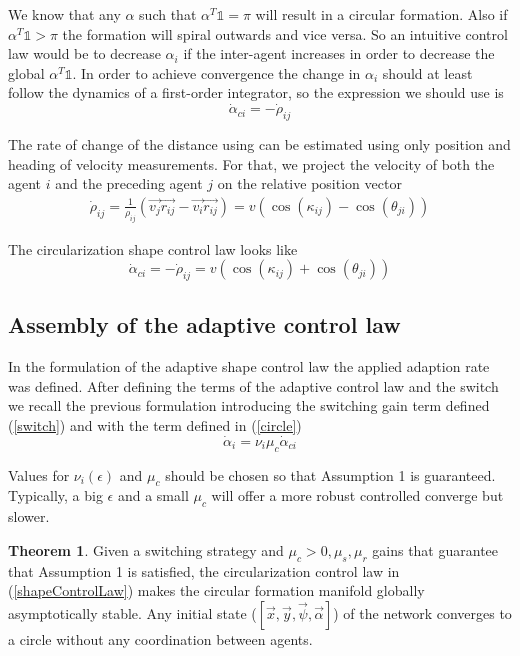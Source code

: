 We know that any $\alpha$ such that $\alpha^T \mathbb{1} = \pi$ will result in a circular formation. Also if $\alpha^T \mathbb{1} > \pi$ the formation will spiral outwards and vice versa. So an intuitive control law would be to decrease $\alpha_i$ if the inter-agent increases in order to decrease the global $\alpha^T \mathbb{1}$. In order to achieve convergence the change in $\alpha_i$ should at least follow the dynamics of a first-order integrator, so the expression we should use is
\begin{equation}
\label{circle}
  \dot{\alpha}_{ci} = - \dot{\rho}_{ij}
\end{equation}


The rate of change of the distance using can be estimated using only position and heading of velocity measurements. For that, we project the velocity of both the agent $i$ and the preceding agent $j$ on the relative position vector
\begin{gather}
  \dot{\rho}_{ij} = \frac{1}{\rho_{ij}} (\vec{v_j} \vec{r_{ij}} - \vec{v_i} \vec{r_{ij}}) = v (\cos(\kappa_{ij}) - \cos(\theta_{ji}))
\end{gather}

The circularization shape control law looks like
\begin{equation}
  \dot{\alpha}_{ci} = -\dot{\rho}_{ij} =  v (\cos(\kappa_{ij}) + \cos(\theta_{ji}))
\end{equation}



\subsection{Assembly of the adaptive control law}
In the formulation of the adaptive shape control law the applied adaption rate was defined. After defining the terms of the adaptive control law and the switch we recall the previous formulation introducing the switching gain term defined (\ref{switch}) and with the term defined in (\ref{circle})
\begin{equation}
\label{shapeControlLaw}
\dot{\alpha}_i = \nu_i \mu_c \dot{\alpha}_{ci}
\end{equation}

Values for $\nu_i(\epsilon)$ and $\mu_c$ should be chosen so that Assumption 1 is guaranteed. Typically, a big $\epsilon$ and a small $\mu_c$ will offer a more robust controlled converge but slower.

\textbf{Theorem 1}. Given a switching strategy and $\mu_c>0, \mu_s, \mu_r$ gains that guarantee that Assumption 1 is satisfied, the circularization control law in (\ref{shapeControlLaw}) makes the circular formation manifold globally asymptotically stable. Any initial state ($[\vec{x}, \vec{y}, \vec{\psi}, \vec{\alpha}]$) of the network converges to a circle without any coordination between agents.

